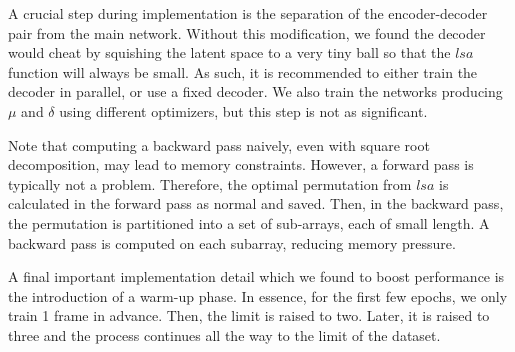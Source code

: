 \documentclass{article}
\begin{document}
A crucial step during implementation is the separation of the encoder-decoder pair from the main network. Without this modification, we found the decoder would cheat by squishing the latent space to a very tiny ball so that the $lsa$ function will always be small. As such, it is recommended to either train the decoder in parallel, or use a fixed decoder. We also train the networks producing $\mu$ and $\delta$ using different optimizers, but this step is not as significant.
    
Note that computing a backward pass naively, even with square root decomposition, may lead to memory constraints. However, a forward pass is typically not a problem. Therefore, the optimal permutation from $lsa$ is calculated in the forward pass as normal and saved. Then, in the backward pass, the permutation is partitioned into a set of sub-arrays, each of small length. A backward pass is computed on each subarray, reducing memory pressure.

A final important implementation detail which we found to boost performance is the introduction of a warm-up phase. In essence, for the first few epochs, we only train 1 frame in advance. Then, the limit is raised to two. Later, it is raised to three and the process continues all the way to the limit of the dataset.
\end{document}
